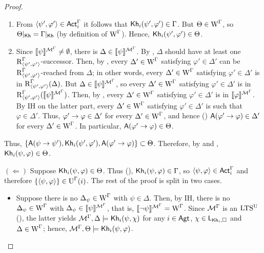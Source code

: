 \begin{proof}
\begin{itemize}
\begin{itemize}
\begin{enumerate}
    \item From $\langle \psi',\varphi' \rangle \in {\rm \sf Act}^\Gamma_i$ it follows that ${\sf Kh}_i(\psi',\varphi') \in \Gamma$.
    But $\Theta \in \operatorname{W}^\Gamma$, so $\Theta\vert_{{\sf Kh}} = \Gamma\vert_{{\sf Kh}}$ (by definition of $\operatorname{W}^\Gamma$).
    Hence, ${\sf Kh}_i(\psi',\varphi') \in \Theta$.

    \item Since $\llbracket \psi \rrbracket^{\mathcal{M}^\Gamma} \neq \emptyset$, there is $\Delta \in \llbracket \psi \rrbracket^{\mathcal{M}^\Gamma}$.
    By , $\Delta$ should have at least one $\operatorname{R}^\Gamma_{\langle \psi',\varphi' \rangle}$-successor.
    Then, by , every $\Delta' \in \operatorname{W}^\Gamma$ satisfying $\varphi' \in \Delta'$ can be $\operatorname{R}^\Gamma_{\langle \psi',\varphi' \rangle}$-reached from $\Delta$; in other words, every $\Delta' \in \operatorname{W}^\Gamma$ satisfying $\varphi' \in \Delta'$ is in $\operatorname{R}^\Gamma_{\langle \psi',\varphi' \rangle}(\Delta)$.
    But $\Delta \in \llbracket \psi \rrbracket^{\mathcal{M}^\Gamma}$, so every $\Delta' \in \operatorname{W}^\Gamma$ satisfying $\varphi' \in \Delta'$ is in $\operatorname{R}^\Gamma_{\langle \psi',\varphi' \rangle}(\llbracket \psi \rrbracket^{\mathcal{M}^\Gamma})$.
    Then, by , every $\Delta' \in \operatorname{W}^\Gamma$ satisfying $\varphi' \in \Delta'$ is in $\llbracket \varphi \rrbracket^{\mathcal{M}^\Gamma}$.
    By IH on the latter part, every $\Delta' \in \operatorname{W}^\Gamma$ satisfying $\varphi' \in \Delta'$ is such that $\varphi \in \Delta'$.
    Thus, $\varphi' \rightarrow \varphi \in \Delta'$ for every $\Delta' \in \operatorname{W}^\Gamma$, and hence () ${\sf A}(\varphi' \rightarrow \varphi) \in \Delta'$ for every $\Delta' \in \operatorname{W}^\Gamma$.
    In particular, ${\sf A}(\varphi' \rightarrow \varphi) \in \Theta$.
\end{enumerate}
Thus, $\{ {\sf A}(\psi \rightarrow \psi'), {\sf Kh}_i(\psi',\varphi'), {\sf A}(\varphi' \rightarrow \varphi) \} \subset \Theta$.
Therefore, by  and , ${\sf Kh}_i(\psi, \varphi) \in \Theta$.
\end{itemize}

$(\Leftarrow)$ Suppose ${\sf Kh}_i(\psi, \varphi) \in \Theta$.
Thus (), ${\sf Kh}_i(\psi, \varphi) \in \Gamma$, so $\langle \psi, \varphi \rangle \in {\rm \sf Act}^\Gamma_i$ and therefore $\{ \langle \psi, \varphi \rangle \} \in \operatorname{U}^\Gamma(i)$.
The rest of the proof is split in two cases.
\begin{itemize}
\item Suppose there is no $\Delta_\psi \in \operatorname{W}^\Gamma$ with $\psi \in \Delta$.
Then, by IH, there is no $\Delta_\psi \in \operatorname{W}^\Gamma$ with $\Delta_\psi \in \llbracket \psi \rrbracket^{\mathcal{M}^\Gamma}$, that is, $\llbracket \lnot\psi \rrbracket^{\mathcal{M}^\Gamma} = \operatorname{W}^\Gamma$.
Since $\mathcal{M}^\Gamma$ is an $\textup{LTS$^\text{\textup{U}}$}$ (), the latter yields $\mathcal{M}^\Gamma, \Delta \models {\sf Kh}_i(\psi, \chi)$ for any $i \in {\rm \sf Agt}$, $\chi \in \mathsf{L}_{{\sf Kh}_i,\square}$ and $\Delta \in \operatorname{W}^\Gamma$; hence, $\mathcal{M}^\Gamma, \Theta \models {\sf Kh}_i(\psi, \varphi)$.


\end{itemize}
\end{itemize}
\end{proof}
